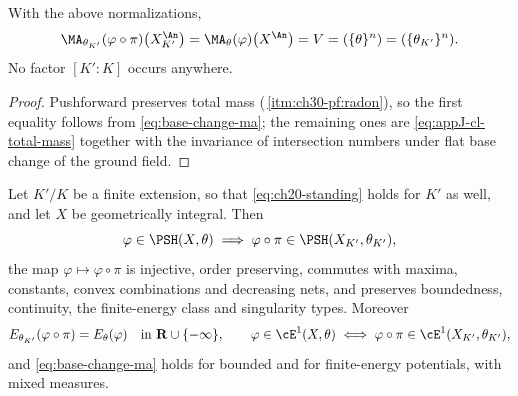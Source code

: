 \begin{corollary}
\label{cor:ch30-base-change-mass}
With the above normalizations,
\begin{equation}
\label{eq:ch30-base-change-mass}
 \MA_{\theta_{K'}}(\varphi\circ\pi)\bigl(X_{K'}^{\An}\bigr)
 =\MA_\theta(\varphi)\bigl(X^{\An}\bigr)=V
 =(\{\theta\}^n)=(\{\theta_{K'}\}^n).
\end{equation}
No factor \([K':K]\) occurs anywhere.
\end{corollary}

\begin{proof}
Pushforward preserves total mass
(\,\cref{itm:ch30-pf:radon}), so the first
equality follows from \eqref{eq:base-change-ma}; the remaining ones are
\eqref{eq:appJ-cl-total-mass} together with the invariance of intersection
numbers under flat base change of the ground field.
\end{proof}

\begin{theorem}
\label{thm:ch30-base-change-psh}
Let \(K'/K\) be a finite extension, so that \eqref{eq:ch20-standing} holds
for \(K'\) as well, and let \(X\) be geometrically integral.  Then
\begin{equation}
\label{eq:ch30-base-change-psh}
 \varphi\in\PSH(X,\theta)
 \implies
 \varphi\circ\pi\in\PSH(X_{K'},\theta_{K'}),
\end{equation}
the map \(\varphi\mapsto\varphi\circ\pi\) is injective, order preserving,
commutes with maxima, constants, convex combinations and decreasing nets,
and preserves boundedness, continuity, the finite-energy class and
singularity types.  Moreover
\begin{equation}
\label{eq:ch30-base-change-e1}
 E_{\theta_{K'}}(\varphi\circ\pi)=E_\theta(\varphi)
 \quad\text{in }\mathbf R\cup\{-\infty\},
 \qquad
 \varphi\in\cE^1(X,\theta)\iff
 \varphi\circ\pi\in\cE^1(X_{K'},\theta_{K'}),
\end{equation}
and \eqref{eq:base-change-ma} holds for bounded and for finite-energy
potentials, with mixed measures.
\end{theorem}

